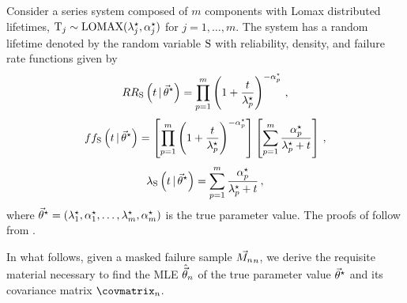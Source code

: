 \documentclass[../main.tex]{subfiles}
\begin{document}
Consider a series system composed of $m$ components with Lomax distributed lifetimes, $\mathrm{T}_j \sim \text{LOMAX}({\lambda}^{\star}_j, {\alpha}^{\star}_j)$ for $j=1,\ldots,m$. The system has a random lifetime denoted by the random variable $\mathrm{S}$ with reliability, density, and failure rate functions given by
\begin{equation}
\label{eq:sys_pareto_reliability_function}
R{R_{\mathrm{S}}} \left ( t {\,|\,} {\vec\theta}^{\star} \right ) =
    \prod_{p=1}^{m} \left (1 + \frac{t}{{\lambda}^{\star}_p} \right )^{-{\alpha}^{\star}_p}\,,
\end{equation}
\begin{equation}
\label{eq:sys_pareto_pdf_function}
f{f_{\mathrm{S}}} \left ( t {\,|\,} {\vec\theta}^{\star} \right ) =
    \left [ \prod_{p=1}^{m} \left (1 + \frac{t}{{\lambda}^{\star}_p} \right )^{-{\alpha}^{\star}_p} \right ]
    \left [ \sum_{p=1}^{m} \frac{{\alpha}^{\star}_p}{{\lambda}^{\star}_p + t} \right ]\,,
\end{equation}
\begin{equation}
\label{eq:sys_pareto_failure_rate_function}
\lambda_{\mathrm{S}} \left ( t {\,|\,} {\vec\theta}^{\star} \right ) = 
    \sum_{p=1}^{m} \frac{{\alpha}^{\star}_p}{{\lambda}^{\star}_p + t}\,,
\end{equation}
where ${\vec\theta}^{\star} = \left ({\lambda}^{\star}_1, {\alpha}^{\star}_1, \ldots, {\lambda}^{\star}_m, {\alpha}^{\star}_m \right )$ is the true parameter value. The proofs of  follow from .

In what follows, given a masked failure sample $\vec{M_n}_n$, we derive the requisite material necessary to find the MLE $\hat{\vec\theta}_n$ of the true parameter value ${\vec\theta}^{\star}$ and its covariance matrix $\covmatrix_n$. 
\end{document}
